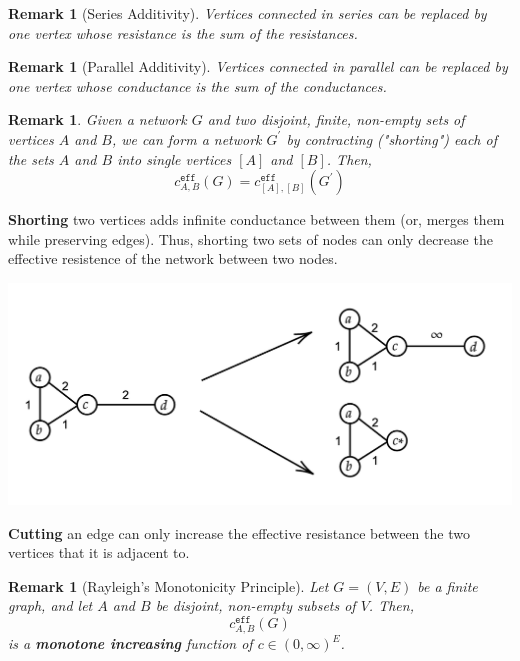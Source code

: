 \documentclass{tufte-handout}
\newtheorem{rmk}[thm]{Remark}
\begin{document}
  \begin{rmk}[Series Additivity]
    Vertices connected in series can be replaced by one vertex whose resistance is the sum of the resistances.
  \end{rmk}

  \begin{rmk}[Parallel Additivity]
    Vertices connected in parallel can be replaced by one vertex whose conductance is the sum of the conductances.
  \end{rmk}

  \begin{rmk}
    Given a network $G$ and two disjoint, finite, non-empty sets of vertices $A$ and $B$, we can form a network $G^{\prime}$ by contracting ("shorting") each of the sets $A$ and $B$ into single vertices $[A]$ and $[B]$. Then,
    \[c_{A,B}^{\texttt{eff}}(G) = c_{[A],[B]}^{\texttt{eff}}(G^{\prime})\]
  \end{rmk}

  \begin{marginfigure}
    \textbf{Shorting} two vertices adds infinite conductance between them (or, merges them while preserving edges). Thus, shorting two sets of nodes can only decrease the effective resistence of the network between two nodes.
    \begin{center}
    \includegraphics[width=\textwidth]{fig-10.png}
    \end{center}

    \noindent \textbf{Cutting} an edge can only increase the effective resistance between the two vertices that it is adjacent to.
  \end{marginfigure}

  \begin{rmk}[Rayleigh's Monotonicity Principle]
    Let $G = (V, E)$ be a finite graph, and let $A$ and $B$ be disjoint, non-empty subsets of $V$. Then, 
    \[c_{A,B}^{\texttt{eff}}(G)\]
    is a \textbf{monotone increasing} function of $c \in (0, \infty)^E$.
  \end{rmk}
  
\end{document}
